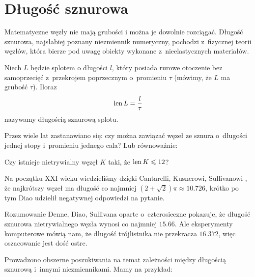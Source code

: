 
\section{Długość sznurowa}
%
Matematyczne węzły nie mają grubości i można je dowolnie rozciągać.
Długość sznurowa, najsłabiej poznany niezmiennik numeryczny, pochodzi z~fizycznej teorii węzłów, która bierze pod uwagę obiekty wykonane z~nieelastycznych materiałów.

\begin{definition}
    Niech $L$ będzie splotem o długości $l$, który posiada rurowe otoczenie bez samoprzecięć z~przekrojem poprzecznym o~promieniu $\tau$ (mówimy, że $L$ ma grubość $\tau$).
    Iloraz
    \begin{equation}
        \operatorname{len} L = \frac l \tau
    \end{equation}
    nazywamy długością sznurową splotu.
\end{definition}

Przez wiele lat zastanawiano się: czy można zawiązać węzeł ze sznura o~długości jednej stopy i~promieniu jednego cala?
Lub równoważnie:

\begin{conjecture}
    Czy istnieje nietrywialny węzęł $K$ taki, że $\operatorname{len} K \leqslant 12$?
\end{conjecture}

Na początku XXI wieku wiedzieliśmy dzięki Cantarelli, Kusnerowi, Sullivanowi \cite{cantarella2002}, że najkrótszy węzeł ma długość co najmniej $(2 + \sqrt 2)\pi \approx 10.726$, krótko po tym Diao \cite[s. 14]{diao2003} udzielił negatywnej odpowiedzi na pytanie.
%
%
%
%

\begin{example}
    Rozumowanie Denne, Diao, Sullivana \cite{denne2006} oparte o~czterosieczne pokazuje, że długość sznurowa nietrywialnego węzła wynosi co najmniej $15.66$.
Ale eksperymenty komputerowe mówią nam, że długość trójlistnika nie przekracza $16.372$, więc oszacowanie jest dość ostre.
\end{example}

Prowadzono obszerne poszukiwania na temat zależności między długością sznurową i~innymi niezmiennikami.
Mamy na przykład:

